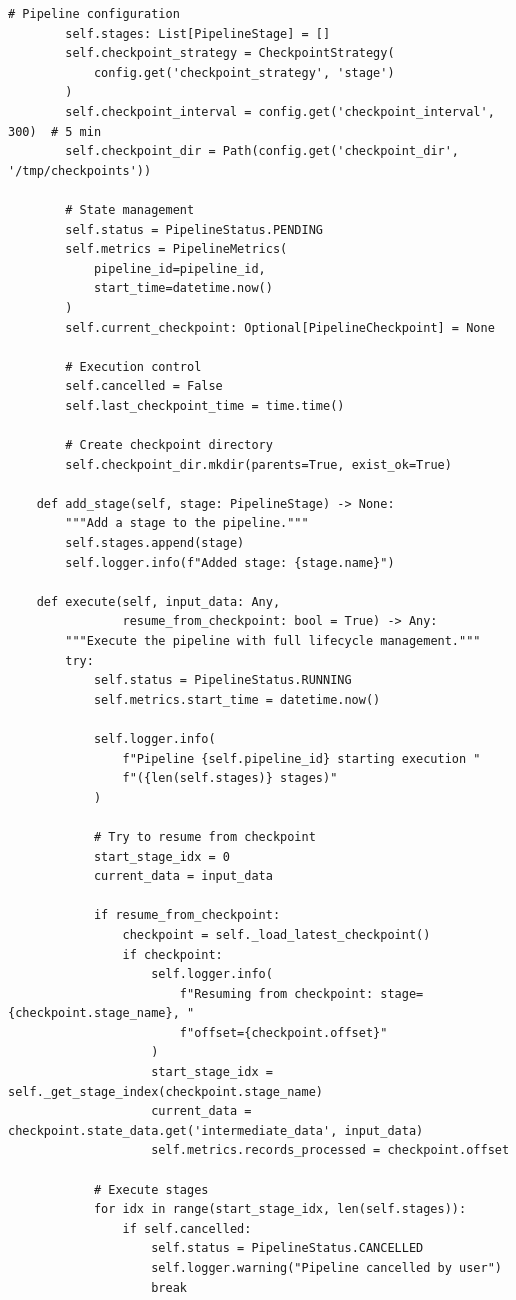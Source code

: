 \begin{lstlisting}[style=python, caption=DataPipeline with Full Lifecycle Management]
        # Pipeline configuration
        self.stages: List[PipelineStage] = []
        self.checkpoint_strategy = CheckpointStrategy(
            config.get('checkpoint_strategy', 'stage')
        )
        self.checkpoint_interval = config.get('checkpoint_interval', 300)  # 5 min
        self.checkpoint_dir = Path(config.get('checkpoint_dir', '/tmp/checkpoints'))

        # State management
        self.status = PipelineStatus.PENDING
        self.metrics = PipelineMetrics(
            pipeline_id=pipeline_id,
            start_time=datetime.now()
        )
        self.current_checkpoint: Optional[PipelineCheckpoint] = None

        # Execution control
        self.cancelled = False
        self.last_checkpoint_time = time.time()

        # Create checkpoint directory
        self.checkpoint_dir.mkdir(parents=True, exist_ok=True)

    def add_stage(self, stage: PipelineStage) -> None:
        """Add a stage to the pipeline."""
        self.stages.append(stage)
        self.logger.info(f"Added stage: {stage.name}")

    def execute(self, input_data: Any,
                resume_from_checkpoint: bool = True) -> Any:
        """Execute the pipeline with full lifecycle management."""
        try:
            self.status = PipelineStatus.RUNNING
            self.metrics.start_time = datetime.now()

            self.logger.info(
                f"Pipeline {self.pipeline_id} starting execution "
                f"({len(self.stages)} stages)"
            )

            # Try to resume from checkpoint
            start_stage_idx = 0
            current_data = input_data

            if resume_from_checkpoint:
                checkpoint = self._load_latest_checkpoint()
                if checkpoint:
                    self.logger.info(
                        f"Resuming from checkpoint: stage={checkpoint.stage_name}, "
                        f"offset={checkpoint.offset}"
                    )
                    start_stage_idx = self._get_stage_index(checkpoint.stage_name)
                    current_data = checkpoint.state_data.get('intermediate_data', input_data)
                    self.metrics.records_processed = checkpoint.offset

            # Execute stages
            for idx in range(start_stage_idx, len(self.stages)):
                if self.cancelled:
                    self.status = PipelineStatus.CANCELLED
                    self.logger.warning("Pipeline cancelled by user")
                    break


\end{lstlisting}
